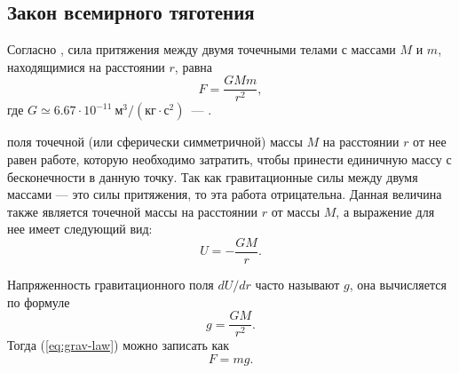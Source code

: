 \subsection{Закон всемирного тяготения}
Согласно , сила притяжения 
между двумя точечными телами с массами $M$ и $m$,
находящимися на расстоянии $r$, равна
\begin{equation}
	F=\frac{GMm}{r^2}, \label{eq:grav-law}
\end{equation}\nopagebreak где $G\simeq 6.67\cdot 10^{-11}~\text{м}^3 / 
\left( \text{кг} \cdot \text{с}^2 \right)$~--- 
.

 поля точечной (или сферически 
симметричной) массы $M$ на расстоянии $r$ от нее равен
работе, которую необходимо затратить, чтобы принести
единичную массу с бесконечности в данную точку. Так как
гравитационные силы между двумя массами --- это силы 
притяжения, то эта работа отрицательна. Данная
величина также является  точечной
массы на расстоянии $r$ от массы $M$, а выражение для нее имеет 
следующий вид:\begin{equation}
U=-\frac{GM}{r}.
\end{equation}

Напряженность гравитационного поля $dU/dr$ часто называют 
 $g$, она вычисляется по формуле
\begin{equation}
	g = \frac{GM}{r^2}.
	\label{eq:g}
\end{equation}
Тогда (\ref{eq:grav-law}) можно записать как \begin{equation}
	F = mg.
\end{equation}
